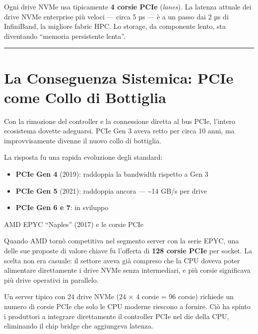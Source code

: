 \documentclass[
  italian,
  openany]{book}
\providecommand{\tightlist}{%
  \setlength{\itemsep}{0pt}\setlength{\parskip}{0pt}}
\begin{document}
Ogni drive NVMe usa tipicamente \textbf{4 corsie PCIe} (\emph{lanes}).
La latenza attuale dei drive NVMe enterprise più veloci --- circa 5 µs
--- è a un passo dai 2 µs di InfiniBand, la migliore fabric HPC. Lo
storage, da componente lento, sta diventando ``memoria persistente
lenta''.

\begin{center}\rule{0.5\linewidth}{0.5pt}\end{center}

\section{La Conseguenza Sistemica: PCIe come Collo di
Bottiglia}\label{la-conseguenza-sistemica-pcie-come-collo-di-bottiglia}

Con la rimozione del controller e la connessione diretta al bus PCIe,
l'intero ecosistema dovette adeguarsi. PCIe Gen 3 aveva retto per circa
10 anni, ma improvvisamente divenne il nuovo collo di bottiglia.

La risposta fu una rapida evoluzione degli standard:

\begin{itemize}
\tightlist
\item
  \textbf{PCIe Gen 4} (2019): raddoppia la bandwidth rispetto a Gen 3
\item
  \textbf{PCIe Gen 5} (2021): raddoppia ancora --- \textasciitilde14
  GB/s per drive
\item
  \textbf{PCIe Gen 6 e 7}: in sviluppo
\end{itemize}

\begin{callouttip}{AMD EPYC “Naples” (2017) e le corsie PCIe}

Quando AMD tornò competitiva nel segmento server con la serie EPYC, una
delle sue proposte di valore chiave fu l'offerta di \textbf{128 corsie
PCIe} per socket. La scelta non era casuale: il settore aveva già
compreso che la CPU doveva poter alimentare direttamente i drive NVMe
senza intermediari, e più corsie significava più drive operativi in
parallelo.

\end{callouttip}

Un server tipico con 24 drive NVMe (24 × 4 corsie = 96 corsie) richiede
un numero di corsie PCIe che solo le CPU moderne riescono a fornire. Ciò
ha spinto i produttori a integrare direttamente il controller PCIe nel
die della CPU, eliminando il chip bridge che aggiungeva latenza.
\end{document}

